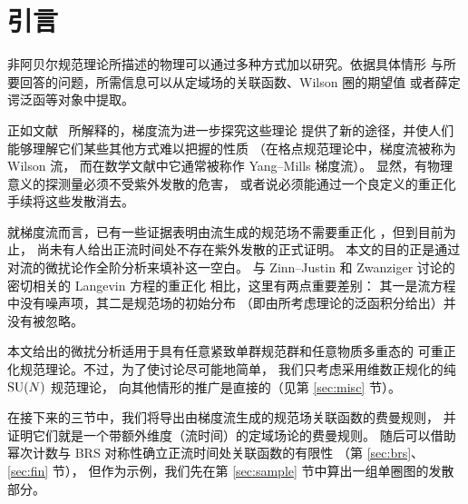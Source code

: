 \section{引言}\label{sec:intro}

非阿贝尔规范理论所描述的物理可以通过多种方式加以研究。依据具体情形
与所要回答的问题，所需信息可以从定域场的关联函数、Wilson 圈的期望值
或者薛定谔泛函等对象中提取。

正如文献~\cite{WilsonFlow,Villasimius} 所解释的，梯度流为进一步探究这些理论
提供了新的途径，并使人们能够理解它们某些其他方式难以把握的性质
（在格点规范理论中，梯度流被称为 Wilson 流，
而在数学文献中它通常被称作 Yang--Mills 梯度流）。
显然，有物理意义的探测量必须不受紫外发散的危害，
或者说必须能通过一个良定义的重正化手续将这些发散消去。

就梯度流而言，已有一些证据表明由流生成的规范场不需要重正化
\cite{WilsonFlow,Villasimius}，但到目前为止，
尚未有人给出正流时间处不存在紫外发散的正式证明。
本文的目的正是通过对流的微扰论作全阶分析来填补这一空白。
与 Zinn--Justin 和 Zwanziger 讨论的密切相关的 Langevin 方程的重正化
\cite{Zinn,ZinnZwanziger} 相比，这里有两点重要差别：
其一是流方程中没有噪声项，其二是规范场的初始分布
（即由所考虑理论的泛函积分给出）并没有被忽略。

本文给出的微扰分析适用于具有任意紧致单群规范群和任意物质多重态的
可重正化规范理论。不过，为了使讨论尽可能地简单，
我们只考虑采用维数正规化的纯 $\mathrm{SU}(N)$ 规范理论，
向其他情形的推广是直接的（见第 \ref{sec:misc} 节）。

在接下来的三节中，我们将导出由梯度流生成的规范场关联函数的费曼规则，
并证明它们就是一个带额外维度（流时间）的定域场论的费曼规则。
随后可以借助幂次计数与 BRS 对称性确立正流时间处关联函数的有限性
（第 \ref{sec:brs}、\ref{sec:fin} 节），
但作为示例，我们先在第 \ref{sec:sample} 节中算出一组单圈图的发散部分。
